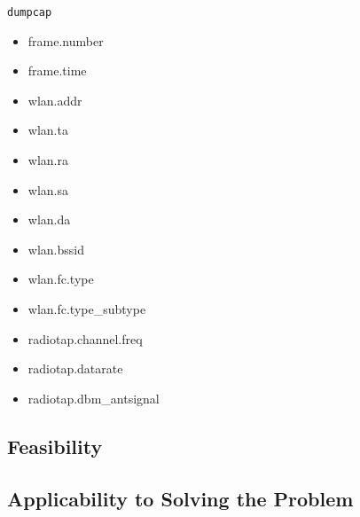 \documentclass[journal, 11pt]{IEEEtran}
\begin{document}
\texttt{dumpcap}

\begin{itemize}
    \item frame.number
    \item frame.time
    \item wlan.addr
    \item wlan.ta
    \item wlan.ra
    \item wlan.sa
    \item wlan.da
    \item wlan.bssid
    \item wlan.fc.type
    \item wlan.fc.type\_subtype
    \item radiotap.channel.freq
    \item radiotap.datarate
    \item radiotap.dbm\_antsignal
\end{itemize}


\subsection{Feasibility}






\subsection{Applicability to Solving the Problem}




\end{document}
